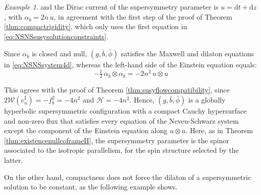 \documentclass[10pt,reqno,a4paper]{amsart}
\theoremstyle{plain}
\theoremstyle{definition}
\theoremstyle{remark}
\theoremstyle{remark}
\newtheorem{ep}[thm]{Example}
\def\dd{\mathrm{d}}
\def\cH{\mathcal{H}}
\def\cW{\mathcal{W}}
\def\cH{\mathcal{H}}
\renewcommand{\(}{ (}
\renewcommand{\)}{ )}
\begin{document}
\begin{ep}
\noindent
and the Dirac current of the supersymmetry parameter is $u = \dd t + \dd z$, with $\alpha_{\bar{b}} = 2n\, u$, in agreement with the first step of the proof of Theorem \ref{thm:compactrigidity}, which only uses the first equation in \eqref{eq:NSNSsusysolutionconstraints}. 




Since $\alpha_{\bar b}$ is closed and null, $(g,\bar b,\bar\phi)$ satisfies the Maxwell and dilaton equations in \eqref{eq:NSNSsystem4d}, whereas the left-hand side of the Einstein equation equals:
\begin{equation*}
-\tfrac12\,\alpha_{\bar b}\otimes\alpha_{\bar b} = -2n^2\,u\otimes u    
\end{equation*}

\noindent
This agrees with the proof of Theorem \ref{thm:susyflowcompatibility}, since $2\cW(e^{\sharp}_u) = - f_b^2 = -4n^2$ and $\cH = -4n^2$. Hence, $(g,\bar{b},\bar{\phi})$ is a globally hyperbolic supersymmetric configuration with a compact Cauchy hypersurface and non-zero flux that satisfies every equation of the Neveu-Schwarz system except the component of the Einstein equation along $u\otimes u$. Here, as in Theorem \ref{thm:existencenullcoframeII}, the supersymmetry parameter is the spinor associated to the isotropic parallelism, for the spin structure selected by the latter.
\end{ep}

\noindent
On the other hand, compactness does not force the dilaton of a supersymmetric solution to be constant, as the following example shows. 
\end{document}
